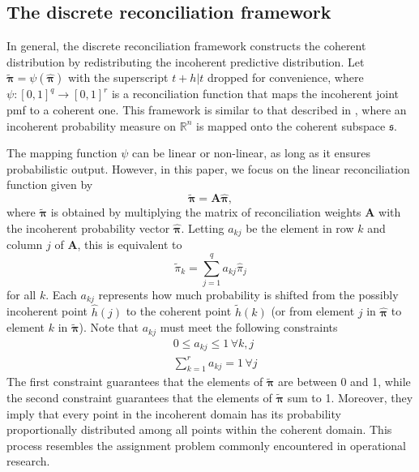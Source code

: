 \documentclass[a4paper,review,12pt,authoryear]{elsarticle}
\newcommand{\bpi}{\bm{\pi}}
\begin{document}
    \subsection{The discrete reconciliation framework}
    
    In general, the discrete reconciliation framework constructs the coherent distribution by redistributing the incoherent predictive distribution. 
    Let $\tilde{\bpi} = \psi(\hat{\bpi})$ with the superscript $t+h|t$ dropped for convenience, where $\psi:[0,1]^q \rightarrow [0,1]^r$ is a reconciliation function that maps the incoherent joint pmf to a coherent one. 
    This framework is similar to that described in \cite{panagiotelisProbabilisticForecastReconciliation2022}, where an incoherent probability measure on $\mathbb{R}^n$ is mapped onto the coherent subspace $\mathfrak{s}$.

    The mapping function $\psi$ can be linear or non-linear, as long as it ensures probabilistic output. 
    However, in this paper, we focus on the linear reconciliation function given by
    \begin{equation}
      \label{eq:framework}
    \tilde{\bpi}=\bm{A}\hat{\bpi},
    \end{equation}
    where $\tilde{\bpi}$ is obtained by multiplying the matrix of reconciliation weights $\bm{A}$ with the incoherent probability vector $\hat{\bpi}$. Letting $a_{kj}$ be the element in row $k$ and column $j$ of $\bm{A}$, this is equivalent to
    \[
      \tilde{\pi}_k=\sum\limits_{j=1}^q a_{kj}\hat{{\pi}}_j
    \]
    for all $k$. 
    Each $a_{kj}$ represents how much probability is shifted from the possibly incoherent point $\hat{h}(j)$ to the coherent point $\tilde{h}(k)$ (or from element $j$ in $\hat{\bpi}$ to element $k$ in $\tilde{\bpi}$). Note that $a_{kj}$ must meet the following constraints
    \begin{align*}
    &0\leq a_{kj} \leq 1 \,\forall k, j\\ 
    &\sum\limits_{k=1}^r a_{kj} = 1 \,\forall j 
    \end{align*}
    The first constraint guarantees that the elements of $\tilde{\bpi}$ are between 0 and 1, while the second constraint guarantees that the elements of $\tilde{\bpi}$ sum to 1.
    Moreover, they imply that every point in the incoherent domain has its probability proportionally distributed among all points  within the coherent domain. 
    This process resembles the assignment problem commonly encountered in operational research.
    
\end{document}
